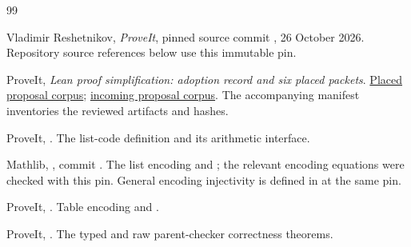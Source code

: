 \begin{thebibliography}{99}
\small

Vladimir Reshetnikov, \emph{ProveIt}, pinned source commit
\href{https://github.com/VladimirReshetnikov/ProveIt/commit/6f46a5e3480a2fa2e45993b8090826f256aeaa56}{},
26 October 2026. Repository source references below use this immutable pin.

ProveIt, \emph{Lean proof simplification: adoption record and six placed packets}.
\href{https://github.com/VladimirReshetnikov/ProveIt/tree/6f46a5e3480a2fa2e45993b8090826f256aeaa56/Computability/DiophantineConsistency/research/lean-proof-simplification}{Placed proposal corpus};
\href{https://github.com/VladimirReshetnikov/ProveIt/tree/6f46a5e3480a2fa2e45993b8090826f256aeaa56/docs/incoming}{incoming proposal corpus}.
The accompanying manifest inventories the reviewed artifacts and hashes.

ProveIt, \href{https://github.com/VladimirReshetnikov/ProveIt/blob/6f46a5e3480a2fa2e45993b8090826f256aeaa56/Computability/DiophantineConsistency/Lean/DiophantineConsistency/AnnotatedCodeArithmetic.lean}{}.
The list-code definition and its arithmetic interface.

Mathlib, \href{https://github.com/leanprover-community/mathlib4/blob/81a5d257c8e410db227a6665ed08f64fea08e997/Mathlib/Logic/Equiv/List.lean}{},
commit .
The list encoding and ; the relevant
encoding equations were checked with this pin. General encoding injectivity
is defined in
\href{https://github.com/leanprover-community/mathlib4/blob/81a5d257c8e410db227a6665ed08f64fea08e997/Mathlib/Logic/Encodable/Basic.lean}{} at the same pin.

ProveIt, \href{https://github.com/VladimirReshetnikov/ProveIt/blob/6f46a5e3480a2fa2e45993b8090826f256aeaa56/Computability/DiophantineConsistency/Lean/DiophantineConsistency/AnnotatedRenameCode.lean}{}.
Table encoding and .

ProveIt, \href{https://github.com/VladimirReshetnikov/ProveIt/blob/6f46a5e3480a2fa2e45993b8090826f256aeaa56/Computability/DiophantineConsistency/Lean/DiophantineConsistency/AnnotatedParents.lean}{}.
The typed and raw parent-checker correctness theorems.


\end{thebibliography}
